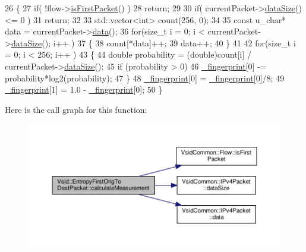 \begin{DoxyCode}
26 \{
27     \textcolor{keywordflow}{if}( !flow->\hyperlink{class_vsid_common_1_1_flow_ae437ae88fb48d6ac2880f40fc88195da}{isFirstPacket}() )
28         \textcolor{keywordflow}{return};
29 
30     \textcolor{keywordflow}{if}( currentPacket->\hyperlink{class_vsid_common_1_1_i_pv4_packet_a39fe36210895625ee87320f5c0c7f52e}{dataSize}() <= 0 )
31         \textcolor{keywordflow}{return};
32 
33     std::vector<int> count(256, 0);
34 
35     \textcolor{keyword}{const} u\_char* data = currentPacket->\hyperlink{class_vsid_common_1_1_i_pv4_packet_a9fb8c763d740e193a68c55604a8a7bd6}{data}();
36     \textcolor{keywordflow}{for}(\textcolor{keywordtype}{size\_t} i = 0; i < currentPacket->\hyperlink{class_vsid_common_1_1_i_pv4_packet_a39fe36210895625ee87320f5c0c7f52e}{dataSize}(); i++ )
37     \{
38         count[*data]++;
39         data++;
40     \}
41 
42     \textcolor{keywordflow}{for}(\textcolor{keywordtype}{size\_t} i = 0; i < 256; i++ )
43     \{
44         \textcolor{keywordtype}{double} probability = (double)count[i] / currentPacket->\hyperlink{class_vsid_common_1_1_i_pv4_packet_a39fe36210895625ee87320f5c0c7f52e}{dataSize}();
45         \textcolor{keywordflow}{if} (probability > 0)
46             \hyperlink{class_vsid_1_1_attribute_meter_a0386b2fe9c5d6ab6fba16029d8da4efe}{\_fingerprint}[0] -= probability*log2(probability);
47     \}
48     \hyperlink{class_vsid_1_1_attribute_meter_a0386b2fe9c5d6ab6fba16029d8da4efe}{\_fingerprint}[0] = \hyperlink{class_vsid_1_1_attribute_meter_a0386b2fe9c5d6ab6fba16029d8da4efe}{\_fingerprint}[0]/8;
49     \hyperlink{class_vsid_1_1_attribute_meter_a0386b2fe9c5d6ab6fba16029d8da4efe}{\_fingerprint}[1] = 1.0 - \hyperlink{class_vsid_1_1_attribute_meter_a0386b2fe9c5d6ab6fba16029d8da4efe}{\_fingerprint}[0];
50 \}\end{DoxyCode}


Here is the call graph for this function\-:
\nopagebreak
\begin{figure}[H]
\begin{center}
\leavevmode
\includegraphics[width=350pt]{class_vsid_1_1_entropy_first_orig_to_dest_packet_a63a5f0ee67b9817eab71b519cc9e892f_cgraph}
\end{center}
\end{figure}



